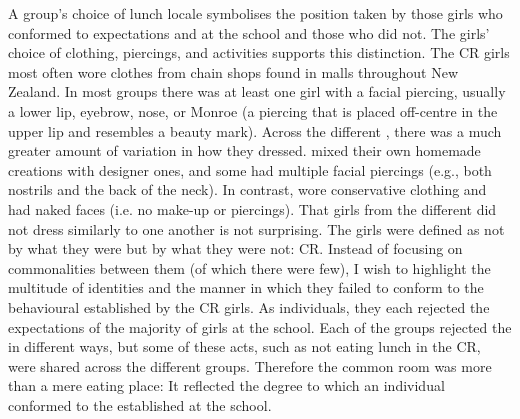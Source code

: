 A group's choice of lunch locale symbolises the position taken by those girls who conformed to expectations and  at the school and those who did not. The girls' choice of clothing, piercings, and activities supports this distinction. The CR girls most often wore clothes from chain shops found in malls throughout New Zealand. In most groups there was at least one girl with a facial piercing, usually a lower lip, eyebrow, nose, or Monroe (a piercing that is placed off-centre in the upper lip and resembles a beauty mark). Across the different , there was a much greater amount of variation in how they dressed.  mixed their own homemade creations with designer ones, and some had multiple facial piercings (e.g., both nostrils and the back of the neck). In contrast,  wore conservative clothing and had naked faces (i.e. no make-up or piercings). That girls from the different  did not dress similarly to one another is not surprising. The girls were defined as  not by what they were but by what they were not: CR. Instead of focusing on commonalities between them (of which there were few), I wish to highlight the multitude of identities and the manner in which they failed to conform to the behavioural  established by the CR girls. As individuals, they each rejected the expectations of the majority of girls at the school. Each of the groups rejected the  in different ways, but some of these acts, such as not eating lunch in the CR, were shared across the different groups. Therefore the common room was more than a mere eating place: It reflected the degree to which an individual conformed to the  established at the school.



